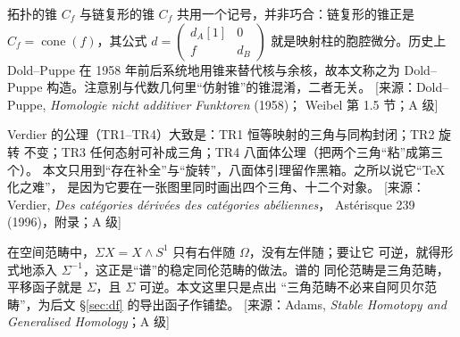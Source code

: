 \begin{yizhu}[“锥”这个名字的来历与两种锥]
拓扑的锥 $C_f$ 与链复形的锥 $C_f$ 共用一个记号，并非巧合：链复形的锥正是
$C_f=\operatorname{cone}(f)$，其公式
$d=\begin{pmatrix}d_A[1]&0\\ f&d_B\end{pmatrix}$ 就是映射柱的胞腔微分。历史上
Dold--Puppe 在 1958 年前后系统地用锥来替代核与余核，故本文称之为 Dold--Puppe
构造。注意别与代数几何里“仿射锥”的锥混淆，二者无关。
[来源：Dold--Puppe, \textit{Homologie nicht additiver Funktoren} (1958)；
Weibel 第 1.5 节；A 级]
\end{yizhu}

\begin{yizhu}[特异三角公理到底有哪几条]
Verdier 的公理（TR1--TR4）大致是：TR1 恒等映射的三角与同构封闭；TR2 旋转
不变；TR3 任何态射可补成三角；TR4 八面体公理（把两个三角“粘”成第三个）。
本文只用到“存在补全”与“旋转”，八面体引理留作黑箱。之所以说它“\TeX{} 化之难”，
是因为它要在一张图里同时画出四个三角、十二个对象。
[来源：Verdier, \textit{Des catégories dérivées des catégories abéliennes}，
Astérisque 239 (1996)，附录；A 级]
\end{yizhu}

\begin{yizhu}
在空间范畴中，$\Sigma X=X\wedge S^1$ 只有右伴随 $\Omega$，没有左伴随；要让它
可逆，就得形式地添入 $\Sigma^{-1}$，这正是“谱”的稳定同伦范畴的做法。谱的
同伦范畴是三角范畴，平移函子就是 $\Sigma$，且 $\Sigma$ 可逆。本文这里只是点出
“三角范畴不必来自阿贝尔范畴”，为后文 §\ref{sec:df} 的导出函子作铺垫。
[来源：Adams, \textit{Stable Homotopy and Generalised Homology}；A 级]
\end{yizhu}
